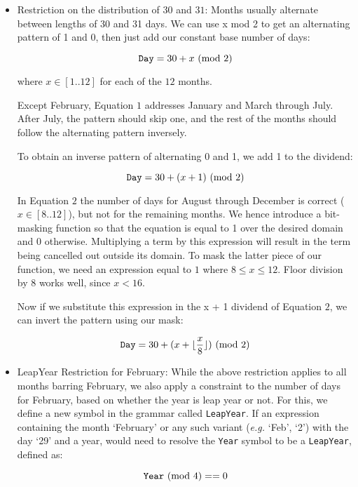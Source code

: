 \begin{itemize}
\item Restriction on the distribution of $30$ and $31$:
Months usually alternate between lengths of 30 and 31 days. We can use x mod 2 to get an alternating pattern of 1 and 0, then just add our constant base number of days:

\begin{equation}
\texttt{Day} = 30 + x \ (\text{mod}\ 2)
\end{equation}

where $x \in [1..12]$ for each of the $12$ months.

Except February, Equation $1$ addresses January and March through July. After July, the pattern should skip one, and the rest of the months should follow the alternating pattern inversely.

To obtain an inverse pattern of alternating 0 and 1, we add 1 to the dividend:

\begin{equation}
\texttt{Day} = 30 + (x + 1) \ (\text{mod}\ 2)
\end{equation}

In Equation $2$ the number of days for August through December is correct ($x \in [8..12]$), but not for the remaining months. We hence introduce a bit-masking function so that the equation is equal to 1 over the desired domain and 0 otherwise. Multiplying a term by this expression will result in the term being cancelled out outside its domain. To mask the latter piece of our function, we need an expression equal to $1$ where $8 \le x\le 12$. Floor division by 8 works well, since $x < 16$.

Now if we substitute this expression in the x + 1 dividend of Equation $2$, we can invert the pattern using our mask:

\begin{equation}
\texttt{Day} = 30 + (x + \lfloor\frac{x}{8}\rfloor) \ (\text{mod}\ 2)
\end{equation}


\item LeapYear Restriction for February:
While the above restriction applies to all months barring February, we also apply a constraint to the number of days for February, based on whether the year is leap year or not. For this, we define a new symbol in the grammar called \texttt{LeapYear}. If an expression containing the month `February' or any such variant (\textit{e.g.} `Feb', `2') with the day `29' and a year, would need to resolve the \texttt{Year} symbol to be a \texttt{LeapYear}, defined as:

\begin{equation}
\texttt{Year} \ (\text{mod}\ 4) == 0
\end{equation}

\end{itemize}

